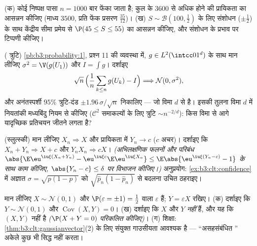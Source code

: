 \begin{exercise}[$\star\star$]\label{exo:b3:clt:6}
(क) कोई निष्पक्ष पासा $n = 1000$ बार फेंका जाता है; कुल के $3600$ से अधिक
होने की प्रायिकता का आसन्नन कीजिए (माध्य $3500$, प्रति फेंक प्रसरण
$\frac{35}{12}$)।
(ख) $S \sim \mathcal B(100, \frac12)$ के लिए  संशोधन ($\pm\frac12$) के साथ केंद्रीय सीमा प्रमेय
से $\P(45 \leq S \leq 55)$ का आसन्नन कीजिए, और संशोधन के प्रभाव पर टिप्पणी कीजिए।
\end{exercise}

\begin{exercise}[$\star\star$]\label{exo:b3:clt:7}
( त्रुटि) \cref{pb:b3:probability:1}, प्रश्न 11 की व्यवस्था में, $g \in
L^2(\intcc01^d)$ के
साथ मान लीजिए $\sigma^2 = \V(g(U_1))$ और $I = \int
g$। दर्शाइए
\[
\sqrt n\,\Bigl(\frac1n\sum_{k\leq n}g(U_k) - I\Bigr)
\Longrightarrow \mathcal N(0, \sigma^2),
\]
और अनंतस्पर्शी $95\%$ त्रुटि-दंड $\pm
1.96\,\sigma/\sqrt n$ निकालिए --- जो विमा $d$ से
 है। इसकी तुलना विमा $d$ में नियतांकी मध्यबिंदु नियम से
कीजिए ($\mathcal C^2$ समाकल्यों के लिए त्रुटि $\sim n^{-2/d}$): किस विमा से आगे
यादृच्छिक प्रतिचयन जीतने लगता है?
\end{exercise}

\begin{exercise}[$\star\star\star$]\label{exo:b3:clt:8}
(स्लुत्स्की) मान लीजिए $X_n \Rightarrow X$ और प्रायिकता में $Y_n \to c$ ($c$ अचर)।
दर्शाइए कि $X_n + Y_n \Rightarrow X +
c$ और $Y_nX_n \Rightarrow cX$। \emph{(अभिलक्षणिक फलनों और परिबंध $\abs{\E\eu^{\iu\xi
(X_n+Y_n)} - \eu^{\iu\xi c}\E\eu^{\iu\xi X_n}} \leq
\E\abs{\eu^{\iu\xi(Y_n - c)} - 1}$
के साथ काम कीजिए, $\abs{Y_n - c}
\leq \delta$ पर विभाजन कीजिए।)} अनुप्रयोग: \cref{ex:b3:clt:confidence} में
अज्ञात $\sigma = \sqrt{p(1-p)}$ को $\sqrt{\hat p_n(1 - \hat
p_n)}$ से बदलना उचित ठहराइए।
\end{exercise}

\begin{exercise}[$\star\star\star$]\label{exo:b3:clt:9}
मान लीजिए $X \sim \mathcal N(0,1)$ और $\P(\varepsilon = \pm1) = \frac12$ वाला $\varepsilon$  हैं; $Y =
\varepsilon X$ रखिए।
(क) दर्शाइए कि $Y \sim \mathcal N(0,1)$ और $\operatorname{Cov}(X, Y) = 0$।
(ख) दर्शाइए कि $X$ और $Y$  \emph{नहीं} हैं, और यह कि
$(X, Y)$  नहीं है \emph{($\P(X + Y =
0)$ परिकलित कीजिए)}।
(ग) शिक्षा: \cref{thm:b3:clt:gaussianvector}(2) के लिए संयुक्त गाउसीयता आवश्यक है ---
``असहसंबंधित '' अकेले कुछ भी सिद्ध नहीं करता।
\end{exercise}

